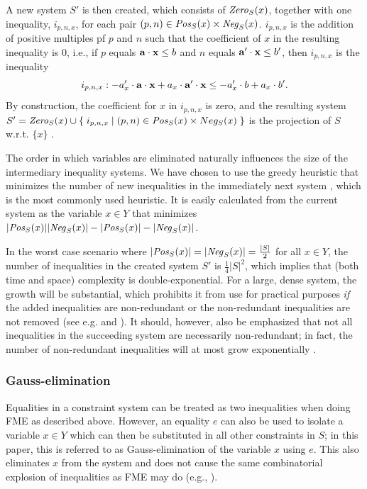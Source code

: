 A new system $S'$ is then created, which consists of $\mathit{Zero}_S(x)$, together with one inequality, $i_{p,n,x}$, for each pair $(p,n)\in \mathit{Pos}_S(x)\times \mathit{Neg}_S(x)$. $i_{p,n,x}$ is the addition of positive multiples pf $p$ and $n$ such that the coefficient of $x$ in the resulting inequality is $0$, i.e., if $p$ equals $\mathbf{a}\cdot\mathbf{x} \leq b$ and $n$ equals $\mathbf{a}'\cdot\mathbf{x} \leq b'$, then $i_{p,n,x}$ is the inequality 
\[
i_{p,n,x}: -a'_x\cdot \mathbf{a}\cdot\mathbf{x} + a_x\cdot \mathbf{a}'\cdot\mathbf{x} \leq -a'_x\cdot b + a_x\cdot b'.
\]
By construction, the coefficient for $x$ in $i_{p,n,x}$ is zero, and the resulting system $S' = \mathit{Zero}_S(x) \cup\\
\{\;{i_{p,n,x}}\;|\;{(p,n)\in \mathit{Pos}_S(x)\times Neg_S(x)}\;\}$ is the projection of $S$ w.r.t. $\{x\}$ \cite{Martin99}. %

The order in which variables are eliminated naturally influences the size of the intermediary inequality systems. We have chosen to use the greedy heuristic {that minimizes the number of new inequalities in the immediately next system \cite{duffin74}}, which is the most commonly used heuristic. It is easily calculated from the current system as the variable $x\in Y$ that minimizes $|\mathit{Pos}_S(x)||\mathit{Neg}_S(x)| - |\mathit{Pos}_S(x)|-|\mathit{Neg}_S(x)|$. 


In the worst case scenario where $|\mathit{Pos}_S(x)| = |\mathit{Neg}_S(x)| = \frac{|S|}{2}$ for all $x\in Y$, the number of inequalities in the created system $S'$ is $\frac{1}{4}|S|^2$, which implies that (both time and space) complexity is double-exponential. For a large, dense system, the growth will be substantial, which prohibits it from use for practical purposes \emph{if} the added inequalities are non-redundant or the non-redundant inequalities are not removed ({see e.g. \cite{lassez93} and \cite{lukatskii08}}). It should, however, also be emphasized that not all inequalities in the succeeding system are necessarily non-redundant; in fact, the number of non-redundant inequalities will at most grow exponentially \cite{monniaux10}.

\subsubsection{Gauss-elimination}
Equalities in a constraint system can be treated as two inequalities when doing FME as described above. However, an equality $e$ can also be used to isolate a variable $x\in Y$ which can then be substituted in all other constraints in $S$; in this paper, this is referred to as Gauss-elimination of the variable $x$ using $e$. This also eliminates $x$ from the system and does not cause the same combinatorial explosion of inequalities as FME may do (e.g., \cite{duffin74,simon05}). 

